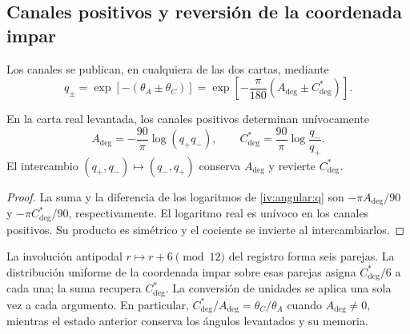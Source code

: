 \subsection{Canales positivos y reversión de la coordenada impar}
\label{iv:angular:canales}

Los canales se publican, en cualquiera de las dos cartas, mediante
\begin{equation}
 q_\pm=\exp[-(\theta_A\pm\theta_C)]
 =\exp\!\left[-\frac{\pi}{180}
                   (A_{\deg}\pm C^*_{\deg})\right].
 \label{iv:angular:q}
\end{equation}

\begin{proposition}
\label{iv:angular:inversion}
En la carta real levantada, los canales positivos determinan
unívocamente
\begin{equation}
 A_{\deg}=-\frac{90}{\pi}\log(q_+q_-),\qquad
 C^*_{\deg}=\frac{90}{\pi}\log\frac{q_-}{q_+}.
 \label{iv:angular:recuperacion}
\end{equation}
El intercambio \((q_+,q_-)\mapsto(q_-,q_+)\) conserva
\(A_{\deg}\) y revierte \(C^*_{\deg}\).
\end{proposition}
\begin{proof}
La suma y la diferencia de los logaritmos de
\eqref{iv:angular:q} son \(-\pi A_{\deg}/90\) y
\(-\pi C^*_{\deg}/90\), respectivamente. El logaritmo real
es unívoco en los canales positivos. Su producto es simétrico
y el cociente se invierte al intercambiarlos.
\end{proof}

La involución antipodal \(r\mapsto r+6\pmod {12}\) del
registro forma seis parejas. La distribución uniforme de la
coordenada impar sobre esas parejas asigna
\(C^*_{\deg}/6\) a cada una; la suma recupera
\(C^*_{\deg}\). La conversión de unidades se aplica una
sola vez a cada argumento. En particular,
\(C^*_{\deg}/A_{\deg}=\theta_C/\theta_A\) cuando
\(A_{\deg}\ne0\), mientras el estado anterior conserva
los ángulos levantados y su memoria.
